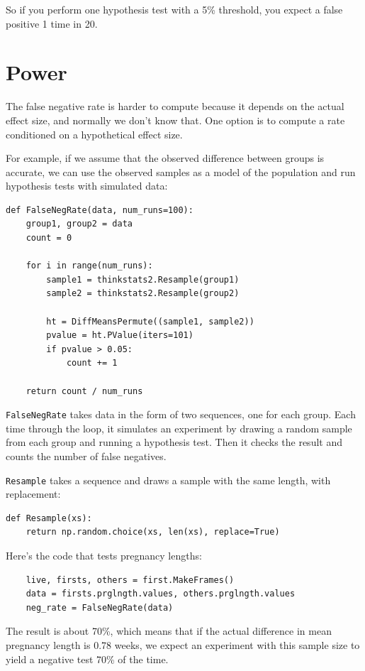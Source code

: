 \documentclass[12pt]{book}
\begin{document}
So if you perform one hypothesis test with a 5\% threshold, you expect
a false positive 1 time in 20.


\section{Power}
\label{power}

The false negative rate is harder to compute because it depends on
the actual effect size, and normally we don't know that.
One option is to compute a rate
conditioned on a hypothetical effect size.

For example, if we assume that the observed difference between groups
is accurate, we can use the observed samples as a model of the
population and run hypothesis tests with simulated data:

\begin{verbatim}
def FalseNegRate(data, num_runs=100):
    group1, group2 = data
    count = 0

    for i in range(num_runs):
        sample1 = thinkstats2.Resample(group1)
        sample2 = thinkstats2.Resample(group2)

        ht = DiffMeansPermute((sample1, sample2))
        pvalue = ht.PValue(iters=101)
        if pvalue > 0.05:
            count += 1

    return count / num_runs
\end{verbatim}

{\tt FalseNegRate} takes data in the form of two sequences, one for
each group.  Each time through the loop, it simulates an experiment by
drawing a random sample from each group and running a hypothesis test.
Then it checks the result and counts the number of false negatives.

{\tt Resample} takes a sequence and draws a sample with the same
length, with replacement:

\begin{verbatim}
def Resample(xs):
    return np.random.choice(xs, len(xs), replace=True)
\end{verbatim}

Here's the code that tests pregnancy lengths:

\begin{verbatim}
    live, firsts, others = first.MakeFrames()
    data = firsts.prglngth.values, others.prglngth.values
    neg_rate = FalseNegRate(data)
\end{verbatim}

The result is about 70\%, which means that if the actual difference in
mean pregnancy length is 0.78 weeks, we expect an experiment with this
sample size to yield a negative test 70\% of the time.
\end{document}
